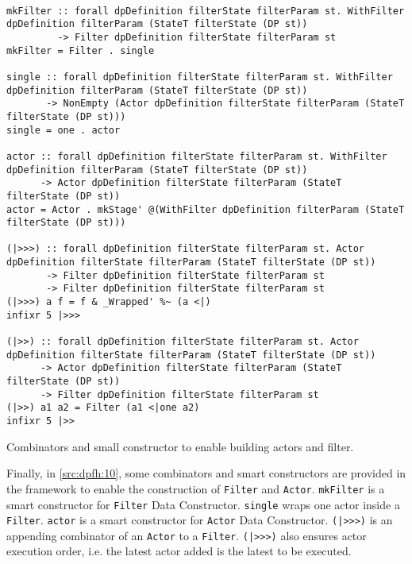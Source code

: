 \begin{listing}[htp!]
  \begin{verbatim}

mkFilter :: forall dpDefinition filterState filterParam st. WithFilter dpDefinition filterParam (StateT filterState (DP st)) 
         -> Filter dpDefinition filterState filterParam st
mkFilter = Filter . single

single :: forall dpDefinition filterState filterParam st. WithFilter dpDefinition filterParam (StateT filterState (DP st)) 
       -> NonEmpty (Actor dpDefinition filterState filterParam (StateT filterState (DP st)))
single = one . actor

actor :: forall dpDefinition filterState filterParam st. WithFilter dpDefinition filterParam (StateT filterState (DP st)) 
      -> Actor dpDefinition filterState filterParam (StateT filterState (DP st))
actor = Actor . mkStage' @(WithFilter dpDefinition filterParam (StateT filterState (DP st)))

(|>>>) :: forall dpDefinition filterState filterParam st. Actor dpDefinition filterState filterParam (StateT filterState (DP st)) 
       -> Filter dpDefinition filterState filterParam st 
       -> Filter dpDefinition filterState filterParam st
(|>>>) a f = f & _Wrapped' %~ (a <|)
infixr 5 |>>>

(|>>) :: forall dpDefinition filterState filterParam st. Actor dpDefinition filterState filterParam (StateT filterState (DP st)) 
      -> Actor dpDefinition filterState filterParam (StateT filterState (DP st)) 
      -> Filter dpDefinition filterState filterParam st
(|>>) a1 a2 = Filter (a1 <|one a2)
infixr 5 |>>
  \end{verbatim}
  \caption[{[\texttt{Stage.hs}] Filter / Actor smart constructors and combinators}]{Combinators and small constructor to enable building actors and filter.}
  \label{src:dpfh:10}
\end{listing}

Finally, in \autoref{src:dpfh:10}, some combinators and smart constructors are provided in the framework to enable the construction of \texttt{Filter} and \texttt{Actor}.
\texttt{mkFilter} is a smart constructor for \texttt{Filter} Data Constructor. \texttt{single} wraps one actor inside a \texttt{Filter}.
\texttt{actor} is a smart constructor for \texttt{Actor} Data Constructor. \texttt{(|>>>)} is an appending combinator of an \texttt{Actor} to a \texttt{Filter}. 
\texttt{(|>>>)} also ensures actor execution order, i.e. the latest actor added is the latest to be executed.


